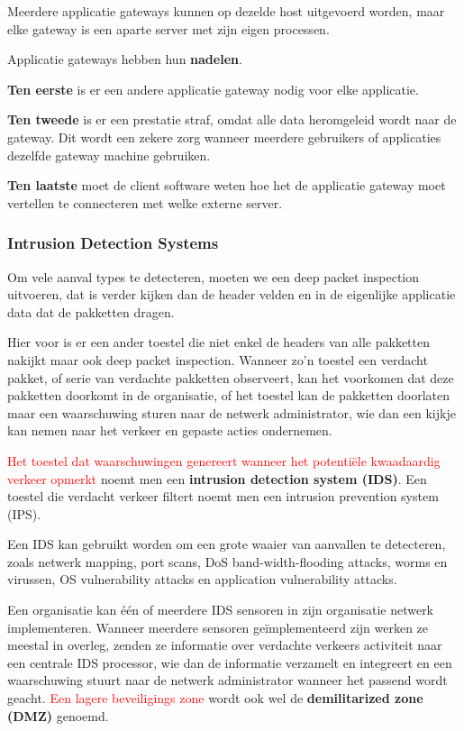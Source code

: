 \noindent Meerdere applicatie gateways kunnen op dezelde host uitgevoerd worden, maar elke gateway is een aparte server met zijn eigen processen.

\noindent Applicatie gateways hebben hun \textbf{nadelen}.

\textbf{Ten eerste} is er een andere applicatie gateway nodig voor elke applicatie. 

\textbf{Ten tweede} is er een prestatie straf, omdat alle data heromgeleid wordt naar de gateway. Dit wordt een zekere zorg wanneer meerdere gebruikers of applicaties dezelfde gateway machine gebruiken. 

\textbf{Ten laatste} moet de client software weten hoe het de applicatie gateway moet vertellen te connecteren met welke externe server.

\subsubsection{Intrusion Detection Systems}

\noindent Om vele aanval types te detecteren, moeten we een deep packet inspection uitvoeren, dat is verder kijken dan de header velden en in de eigenlijke applicatie data dat de pakketten dragen.

\noindent Hier voor is er een ander toestel die niet enkel de headers van alle pakketten nakijkt maar ook deep packet inspection. Wanneer zo’n toestel een verdacht pakket, of serie van verdachte pakketten observeert, kan het voorkomen dat deze pakketten doorkomt in de organisatie, of het toestel kan de pakketten doorlaten maar een waarschuwing sturen naar de netwerk administrator, wie dan een kijkje kan nemen naar het verkeer en gepaste acties ondernemen.

\noindent\textcolor{red}{ Het toestel dat waarschuwingen genereert wanneer het potentiële kwaadaardig verkeer opmerkt} noemt men een \textbf{intrusion detection system (IDS)}. Een toestel die verdacht verkeer filtert noemt men een intrusion prevention system (IPS).

\noindent Een IDS kan gebruikt worden om een grote waaier van aanvallen te detecteren, zoals netwerk mapping, port scans, DoS band-width-flooding attacks, worms en virussen, OS vulnerability attacks en application vulnerability attacks.

\noindent Een organisatie kan één of meerdere IDS sensoren in zijn organisatie netwerk implementeren. Wanneer meerdere sensoren geïmplementeerd zijn werken ze meestal in overleg, zenden ze informatie over verdachte verkeers activiteit naar een centrale IDS processor, wie dan de informatie verzamelt en integreert en een waarschuwing stuurt naar de netwerk administrator wanneer het passend wordt geacht. \noindent\textcolor{red}{Een lagere beveiligings zone} wordt ook wel de \textbf{demilitarized zone (DMZ)} genoemd.

